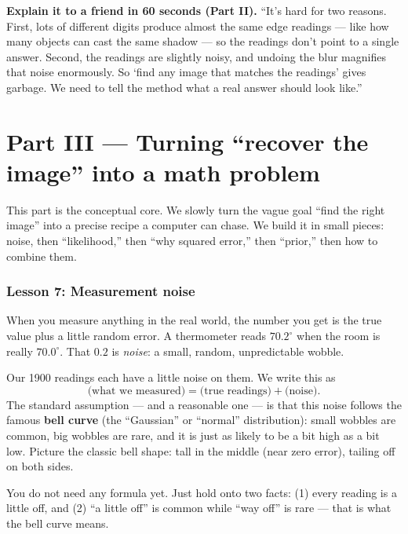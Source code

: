 \documentclass[11pt]{article}
\begin{document}
\begin{intuition}
\textbf{Explain it to a friend in 60 seconds (Part II).} ``It's hard for two
reasons. First, lots of different digits produce almost the same edge readings
--- like how many objects can cast the same shadow --- so the readings don't
point to a single answer. Second, the readings are slightly noisy, and undoing
the blur magnifies that noise enormously. So `find any image that matches the
readings' gives garbage. We need to tell the method what a real answer should
look like.''
\end{intuition}

\part*{Part III --- Turning ``recover the image'' into a math problem}

This part is the conceptual core. We slowly turn the vague goal ``find the
right image'' into a precise recipe a computer can chase. We build it in
small pieces: noise, then ``likelihood,'' then ``why squared error,'' then
``prior,'' then how to combine them.

\section{Lesson 7: Measurement noise}

When you measure anything in the real world, the number you get is the true
value plus a little random error. A thermometer reads $70.2^\circ$ when the
room is really $70.0^\circ$. That $0.2$ is \emph{noise}: a small, random,
unpredictable wobble.

Our 1900 readings each have a little noise on them. We write this as
\[
\text{(what we measured)} = \text{(true readings)} + \text{(noise)} .
\]
The standard assumption --- and a reasonable one --- is that this noise follows
the famous \textbf{bell curve} (the ``Gaussian'' or ``normal''
distribution): small wobbles are common, big wobbles are rare, and it is just
as likely to be a bit high as a bit low. Picture the classic bell shape:
tall in the middle (near zero error), tailing off on both sides.

\begin{intuition}
You do not need any formula yet. Just hold onto two facts: (1) every reading
is a little off, and (2) ``a little off'' is common while ``way off'' is rare
--- that is what the bell curve means.
\end{intuition}
\end{document}
